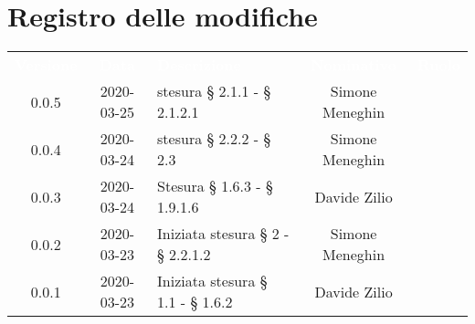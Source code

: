 
\section*{Registro delle modifiche}
{
	\renewcommand{\arraystretch}{1.5}
	\centering
	\begin{longtable}{ c c  C{4cm}  c  c }
		
		\textcolor{white}{\textbf{Versione}} & \textcolor{white}{\textbf{Data}} & \textcolor{white}{\textbf{Descrizione}} & \textcolor{white}{\textbf{Nominativo}} & \textcolor{white}{\textbf{Ruolo}}\\
		
		0.0.5 & 2020-03-25 & stesura § 2.1.1 - § 2.1.2.1 & Simone Meneghin &\reda{}\\	

		0.0.4 & 2020-03-24 & stesura § 2.2.2 - § 2.3 & Simone Meneghin &\reda{}\\		
		
		0.0.3 & 2020-03-24 & Stesura § 1.6.3 - § 1.9.1.6 & Davide Zilio &\reda{}\\
		
		0.0.2 & 2020-03-23 & Iniziata stesura § 2 - § 2.2.1.2 & Simone Meneghin &\reda{}\\
		
		0.0.1 & 2020-03-23 & Iniziata stesura § 1.1 - § 1.6.2 & Davide Zilio &\reda{}\\		
		
	\end{longtable}

}